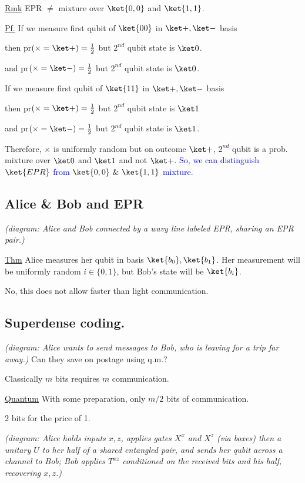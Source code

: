 \documentclass[11pt]{article}
\begin{document}
\underline{Rmk} EPR $\neq$ mixture over $\ket{0,0}$ and $\ket{1,1}$.

\underline{Pf.} If we measure first qubit of $\ket{00}$ in $\ket+,\ket-$ basis

then pr$(\times=\ket+) = \frac12$ but $2^{nd}$ qubit state is $\ket0$.

and pr$(\times=\ket-) = \frac12$ but $2^{nd}$ qubit state is $\ket0$.

If we measure first qubit of $\ket{11}$ in $\ket+,\ket-$ basis

then pr$(\times=\ket+) = \frac12$ but $2^{nd}$ qubit state is $\ket1$

and pr$(\times=\ket-) = \frac12$ but $2^{nd}$ qubit state is $\ket1$.

Therefore, $\times$ is uniformly random but on outcome $\ket+$, $2^{nd}$ qubit is a prob. mixture over $\ket0$ and $\ket1$ and not $\ket+$. \textcolor{blue}{So, we can distinguish $\ket{EPR}$ from $\ket{0,0}\ \&\ \ket{1,1}$ mixture.}

\subsection*{Alice \& Bob and EPR}

\emph{(diagram: Alice and Bob connected by a wavy line labeled EPR, sharing an EPR pair.)}

\underline{Thm}
Alice measures her qubit in basis $\ket{b_0},\ket{b_1}$. Her measurement will be uniformly random $i\in\{0,1\}$, but Bob's state will be $\ket{b_i}$.

No, this does not allow faster than light communication.

\subsection*{Superdense coding.}

\emph{(diagram: Alice wants to send messages to Bob, who is leaving for a trip far away.)} Can they save on postage using q.m.?

Classically $m$ bits requires $m$ communication.

\underline{Quantum} With some preparation, only $m/2$ bits of communication.

2 bits for the price of 1.

\emph{(diagram: Alice holds inputs $x,z$, applies gates $X^x$ and $X^z$ (via boxes) then a unitary $U$ to her half of a shared entangled pair, and sends her qubit across a channel to Bob; Bob applies $T^{xz}$ conditioned on the received bits and his half, recovering $x,z$.)}
\end{document}

